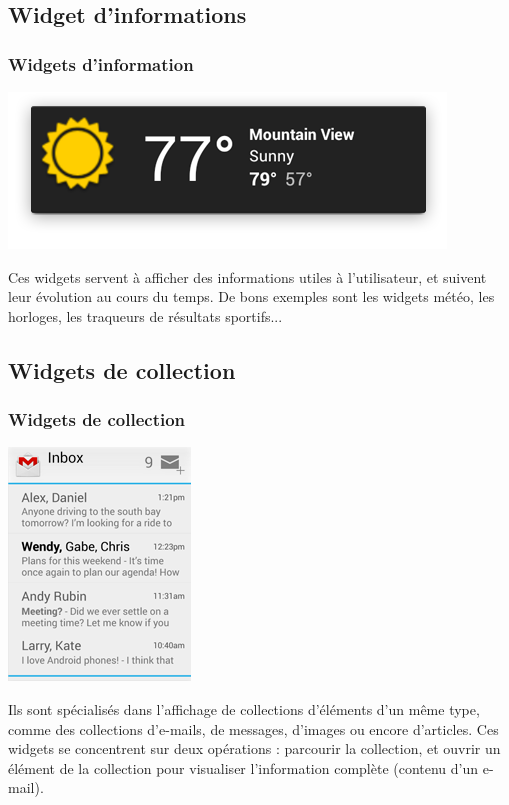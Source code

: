 \documentclass{beamer}
\begin{document}
\subsection{Widget d'informations}
\begin{frame}
\frametitle{Widgets d'information}
\begin{center}
\includegraphics[scale=0.3]{widgets_info.png}
\end{center}

Ces widgets servent à afficher des informations utiles à l'utilisateur, et suivent leur évolution au cours du temps. De bons exemples sont les widgets météo, les horloges, les traqueurs de résultats sportifs...
\end{frame}

\subsection{Widgets de collection}
\begin{frame}
\frametitle{Widgets de collection}
\begin{center}
\includegraphics[scale=0.4]{widgets_collection_gmail.png}
\end{center}

Ils sont spécialisés dans l'affichage de collections d'éléments d'un même type, comme des collections d'e-mails, de messages, d'images ou encore d'articles. Ces widgets se concentrent sur deux opérations : parcourir la collection, et ouvrir un élément de la collection pour visualiser l'information complète (contenu d'un e-mail).
\end{frame}
\end{document}
